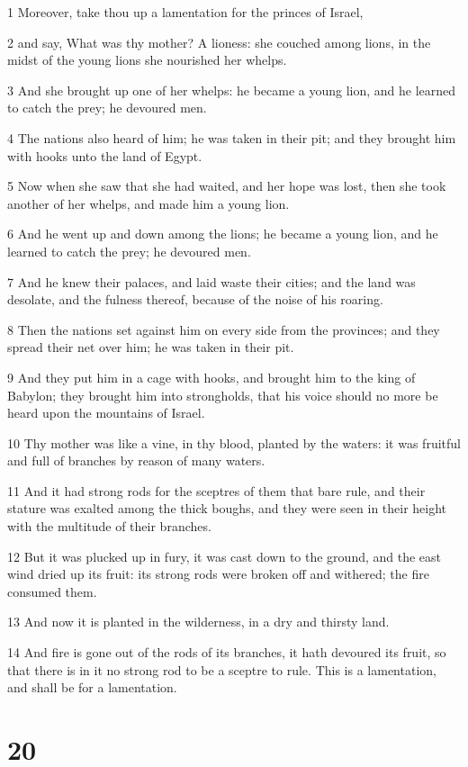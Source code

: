 \par 1 Moreover, take thou up a lamentation for the princes of Israel,
\par 2 and say, What was thy mother? A lioness: she couched among lions, in the midst of the young lions she nourished her whelps.
\par 3 And she brought up one of her whelps: he became a young lion, and he learned to catch the prey; he devoured men.
\par 4 The nations also heard of him; he was taken in their pit; and they brought him with hooks unto the land of Egypt.
\par 5 Now when she saw that she had waited, and her hope was lost, then she took another of her whelps, and made him a young lion.
\par 6 And he went up and down among the lions; he became a young lion, and he learned to catch the prey; he devoured men.
\par 7 And he knew their palaces, and laid waste their cities; and the land was desolate, and the fulness thereof, because of the noise of his roaring.
\par 8 Then the nations set against him on every side from the provinces; and they spread their net over him; he was taken in their pit.
\par 9 And they put him in a cage with hooks, and brought him to the king of Babylon; they brought him into strongholds, that his voice should no more be heard upon the mountains of Israel.
\par 10 Thy mother was like a vine, in thy blood, planted by the waters: it was fruitful and full of branches by reason of many waters.
\par 11 And it had strong rods for the sceptres of them that bare rule, and their stature was exalted among the thick boughs, and they were seen in their height with the multitude of their branches.
\par 12 But it was plucked up in fury, it was cast down to the ground, and the east wind dried up its fruit: its strong rods were broken off and withered; the fire consumed them.
\par 13 And now it is planted in the wilderness, in a dry and thirsty land.
\par 14 And fire is gone out of the rods of its branches, it hath devoured its fruit, so that there is in it no strong rod to be a sceptre to rule. This is a lamentation, and shall be for a lamentation.

\chapter{20}

